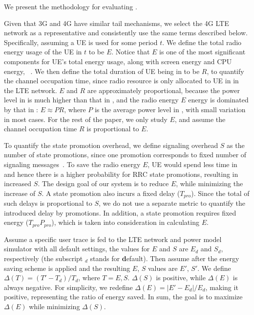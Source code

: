 \label{sec:method}

We present the methodology for evaluating \NAME.



Given that 3G and 4G have similar tail mechanisms, we select the 4G LTE network as a representative and consistently use the same terms described below. Specifically, assuming a UE is used for some period $t$. We define the total radio energy usage of the UE in $t$ to be $E$. Notice that $E$ is one of the most significant components for UE's total energy usage, along with screen energy and CPU energy, \etc~\cite{mobisys.aro}. We then define the total duration of UE being in \RC to be $R$, to quantify the channel occupation time, since radio resource is only allocated to UE in \RC in the LTE network. $E$ and $R$ are approximately proportional, because the power level in \RC is much higher than that in \RI, and the radio energy $E$ energy is dominated by that in \RC: $E \approx PR$, where $P$ is the average power level in \RC, with small variation in most cases. For the rest of the paper, we only study $E$, and assume the channel occupation time $R$ is proportional to $E$.

To quantify the state promotion overhead, we define signaling overhead $S$ as the number of state promotions, since one promotion corresponds to fixed number of signaling messages~\cite{radiojockey}. To save the radio energy $E$, UE would spend less time in \RC and hence there is a higher probability for RRC state promotions, resulting in increased $S$. The design goal of our system is to reduce $E$, while minimizing the increase of $S$. A state promotion also incurs a fixed delay ($T_{pro}$). Since the total of such delays is proportional to $S$, we do not use a separate metric to quantify the introduced delay by promotions. In addition, a state promotion requires fixed energy ($T_{pro}P_{pro}$), which is taken into consideration in calculating $E$.

Assume a specific user trace is fed to the LTE network and power model simulator with all default settings, the values for $E$ and $S$ are $E_{d}$ and $S_{d}$, respectively (the subscript $_{d}$ stands for \textbf{d}efault). Then assume after the energy saving scheme is applied and the resulting $E$, $S$ values are $E'$, $S'$. We define $\Delta(T) = (T' - T_{d}) / T_{d}$, where $T = E, S$. $\Delta(S)$ is positive, while $\Delta(E)$ is always negative. For simplicity, we redefine $\Delta(E) = |E' - E_{d}| / E_{d}$, making it positive, representing the ratio of energy saved. In sum, the goal is to maximize $\Delta(E)$ while minimizing $\Delta(S)$.



